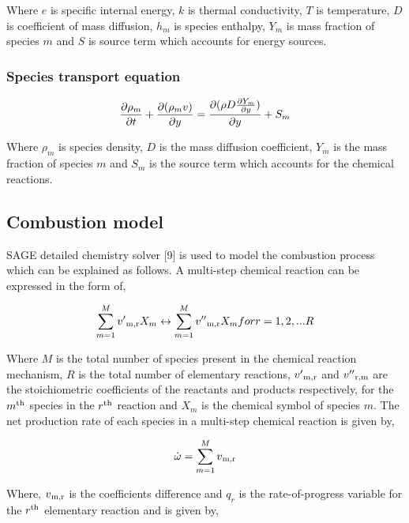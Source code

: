 \documentclass[conference]{IEEEtran}
\begin{document}
Where $e$ is specific internal energy, $k$ is thermal conductivity, $T$ is temperature, $D$ is coefficient of mass diffusion, $h_m$ is species enthalpy, $Y_m$ is mass fraction of species $m$ and $S$ is source term which accounts for energy sources.\\

\subsubsection{Species transport equation}

    \begin{gather*}
        \pdv{\rho_m}{t} + \pdv{(\rho_m v)}{y} = \pdv{(\rho D \pdv{Y_m}{y})}{y} +  S_m
    \end{gather*}

Where $\rho_m$ is species density, $D$ is the mass diffusion coefficient, $Y_m$ is the mass fraction of species $m$ and $S_m$ is the source term which accounts for the chemical reactions.

\subsection{Combustion model}
SAGE detailed chemistry solver [9] is used to model the combustion process which can be explained as follows. 
A multi-step chemical reaction can be expressed in the form of,

\begin{gather*}
    \sum_{m=1}^{M} v'\textsubscript{m,r} X_m \leftrightarrow \sum_{m=1}^{M} v''\textsubscript{m,r} X_m for  r = 1,2,...R
\end{gather*}

Where $M$ is the total number of species present in the chemical reaction mechanism, $R$ is the total number of elementary reactions, $v'\textsubscript{m,r}$ and $v''\textsubscript{r,m}$ are the stoichiometric coefficients of the reactants and products respectively, for the $m\textsuperscript{th}$ species in the $r\textsuperscript{th}$ reaction and $X_m$ is the chemical symbol of species $m$.
The net production rate of each species in a multi-step chemical reaction is given by,

\begin{gather*}
    \dot\omega = \sum_{m=1}^{M} v\textsubscript{m,r} 
\end{gather*}

Where, $v\textsubscript{m,r}$ is the coefficients difference and $q_r$ is the rate-of-progress variable for the $r\textsuperscript{th}$ elementary reaction and is given by,
\end{document}
